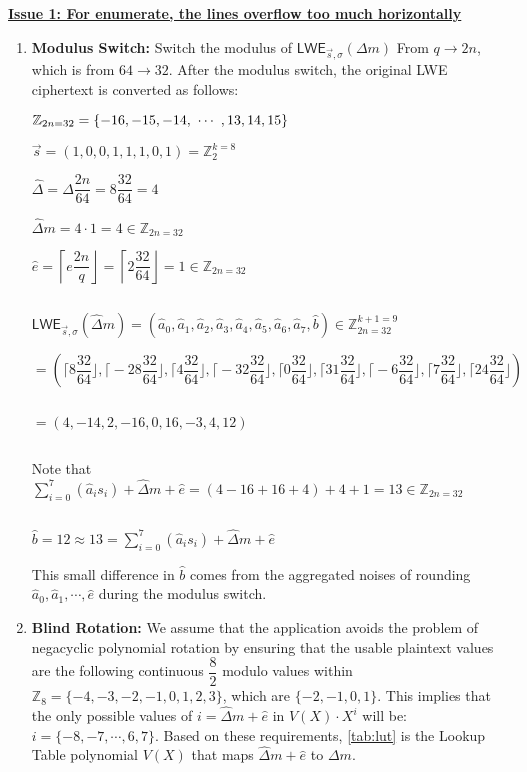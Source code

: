 \underline{\textbf{Issue 1: For enumerate, the lines overflow too much horizontally}}

\begin{enumerate}
\item \textbf{Modulus Switch:} Switch the modulus of $\textsf{LWE}_{\vec{s}, \sigma}(\Delta m)$ From $q \rightarrow 2n$, which is from $64 \rightarrow 32$. After the modulus switch, the original LWE ciphertext is converted as follows:

$\mathbb{Z}_{2n=32} = \{-16, -15, -14, \text{ } \text{$\cdots$} \text{ }, 13, 14, 15\}$

$\vec{s} = (1, 0, 0, 1, 1, 1, 0, 1) = \mathbb{Z}_2^{k=8}$


$\hat{\Delta} = \Delta\dfrac{2n}{64} = 8\dfrac{32}{64} = 4$

$\hat{\Delta}m = 4 \cdot 1 = 4 \in \mathbb{Z}_{2n=32}$

$\hat{e} =  \left\lceil e \dfrac{2n}{q} \right\rfloor = \left\lceil 2\dfrac{32}{64} \right\rfloor = 1 \in \mathbb{Z}_{2n=32}$

$ $

$\textsf{LWE}_{\vec{s}, \sigma}(\hat{\Delta}m) = (\hat{a}_0, \hat{a}_1, \hat{a}_2, \hat{a}_3, \hat{a}_4, \hat{a}_5, \hat{a}_6, \hat{a}_7, \hat{b}) \in \mathbb{Z}_{2n=32}^{k+1=9}$


$ = (\Big\lceil 8\dfrac{32}{64} \Big\rfloor, \Big\lceil -28\dfrac{32}{64}\Big\rfloor, \Big\lceil 4\dfrac{32}{64}\Big\rfloor, \Big\lceil -32\dfrac{32}{64}\Big\rfloor, \Big\lceil 0\dfrac{32}{64}\Big\rfloor, \Big\lceil 31\dfrac{32}{64}\Big\rfloor, \Big\lceil -6\dfrac{32}{64}\Big\rfloor, \Big\lceil 7\dfrac{32}{64}\Big\rfloor, \Big\lceil 24\dfrac{32}{64}\Big\rfloor)$

$ $

$= (4, {-14}, 2, -16, 0, 16, {-3}, 4, 12)$

$ $

Note that $\sum\limits_{i=0}^{7}(\hat{a}_is_i) + \hat{\Delta}m + \hat{e} = (4 - 16 + 16 + 4) + 4 + 1 = 13 \in \mathbb{Z}_{2n=32}$

$ $

$\hat b = 12 \approx 13 = \sum\limits_{i=0}^{7}(\hat{a}_is_i) + \hat{\Delta}m + \hat{e}$

This small difference in $\hat b$ comes from the aggregated noises of rounding $\hat a_0, \hat a_1, \cdots , \hat e$ during the modulus switch. 


\item \textbf{Blind Rotation:} We assume that the application avoids the problem of negacyclic polynomial rotation by ensuring that the usable plaintext values are the following continuous $\dfrac{8}{2}$ modulo values within $\mathbb{Z}_8 = \{-4, -3, -2, -1, 0, 1, 2, 3\}$, which are $\{-2, -1, 0, 1\}$. This implies that the only possible values of $i=\hat\Delta m + \hat e$ in $V(X)\cdot X^{i}$ will be: $i = \{-8, -7, \cdots, 6, 7\}$. Based on these requirements, \autoref{tab:lut} is the Lookup Table polynomial $V(X)$ that maps $\hat{\Delta} m + \hat{e}$ to $\Delta m$. 



\end{enumerate}
